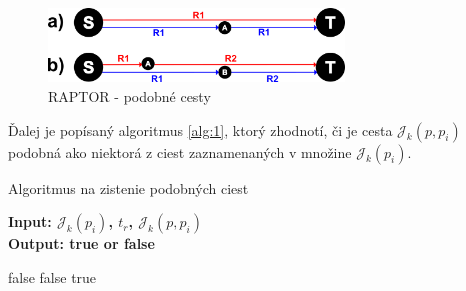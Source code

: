 \begin{figure}[H]
\centerline{\includegraphics[width=0.7\textwidth]{images/similar-paths}}
\caption[RAPTOR - podobné cesty]{RAPTOR - podobné cesty}
\label{fig:similar-paths}
\end{figure}

Ďalej je popísaný algoritmus \ref{alg:1}, ktorý zhodnotí, či je cesta $\mathcal{J}_k(p, p_i)$ podobná ako niektorá z ciest zaznamenaných v množine $\mathcal{J}_k(p_i)$.

\begin{algorithm}
\caption{Algoritmus na zistenie podobných ciest}\label{alg:1}
 \hspace*{\algorithmicindent} \textbf{Input: $\mathcal{J}_k(p_i)$, $t_r$, $\mathcal{J}_k(p, p_i)$} \\
 \hspace*{\algorithmicindent} \textbf{Output: true or false} 
\begin{algorithmic}[1]
 \Return false
 \Return false
\Else {} \Return true
\EndIf
\EndFor
\end{algorithmic}
\end{algorithm}

